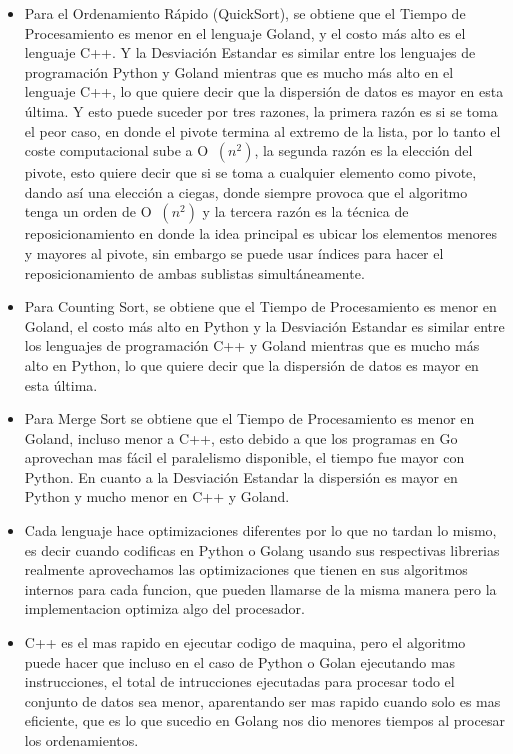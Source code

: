 \documentclass{article}
\begin{document}
\begin{itemize}
            \item Para el Ordenamiento Rápido (QuickSort), se obtiene que el Tiempo de Procesamiento es menor en el lenguaje Goland, y el costo más alto es el lenguaje C++. Y la Desviación Estandar es similar entre los lenguajes de programación Python y Goland mientras que es mucho más alto en el lenguaje C++, lo que quiere decir que la dispersión de datos es mayor en esta última. Y esto puede suceder por tres razones, la primera razón es si se toma el peor caso, en donde el pivote termina al extremo de la lista, por lo tanto el coste computacional sube a O $\ (n^2)$, la segunda razón es la elección del pivote, esto quiere decir que si se toma a cualquier elemento como pivote, dando así una elección a ciegas, donde siempre provoca que el algoritmo tenga un orden de O $\ (n^2)$ y la tercera razón es la técnica de reposicionamiento en donde la idea principal es ubicar los elementos menores y mayores al pivote, sin embargo se puede usar índices para hacer el reposicionamiento de ambas sublistas simultáneamente.
\end{itemize}
\begin{itemize}
            \item Para Counting Sort, se obtiene que el Tiempo de Procesamiento es menor en Goland, el costo más alto en Python y la Desviación Estandar es similar entre los lenguajes de programación C++ y Goland mientras que es mucho más alto en Python, lo que quiere decir que la dispersión de datos es mayor en esta última.
\end{itemize}

\begin{itemize}
            \item Para Merge Sort se obtiene que el Tiempo de Procesamiento es menor en Goland, incluso menor a C++, esto debido a que los programas en Go aprovechan mas fácil el paralelismo disponible, el tiempo fue mayor con Python. En cuanto a la Desviación Estandar la dispersión es mayor en Python y mucho menor en C++ y Goland.
\end{itemize}    
\begin{itemize}
            \item Cada lenguaje hace optimizaciones diferentes por lo que no tardan lo mismo, es decir cuando codificas en Python o Golang usando sus respectivas librerias realmente aprovechamos las optimizaciones que tienen en sus algoritmos internos para cada funcion, que pueden llamarse de la misma manera pero la implementacion optimiza algo del procesador.
\end{itemize}
\begin{itemize}
            \item C++ es el mas rapido en ejecutar codigo de maquina, pero el algoritmo puede hacer que incluso en el caso de Python o Golan ejecutando mas instrucciones, el total de intrucciones ejecutadas para procesar todo el conjunto de datos sea menor, aparentando ser mas rapido cuando solo es mas eficiente, que es lo que sucedio en Golang nos dio menores tiempos al procesar los ordenamientos.
\end{itemize}	
		
	
\end{document}
